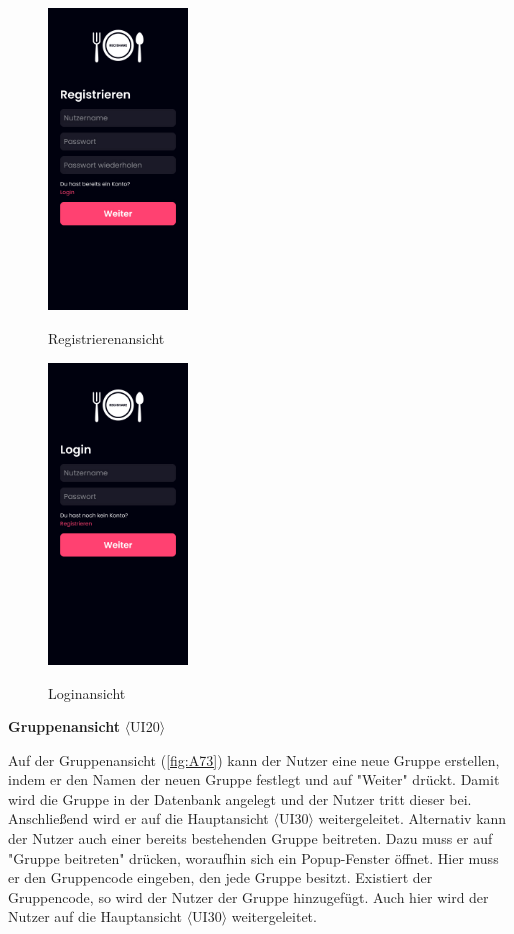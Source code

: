\documentclass[parskip=full]{scrartcl}
\begin{document}
\begin{figure}[htp]
    \begin{minipage}
        [t]{0.5\textwidth}
        \centering
        \includegraphics[height=80mm]{images/section7/RegisterView.jpg}
        \label{fig:A71}
        \caption{Registrierenansicht}
    \end{minipage}
    \begin{minipage}
        [t]{0.5\textwidth}
        \centering
        \includegraphics[height=80mm]{images/section7/LoginView.jpg}
        \label{fig:A72}
        \caption{Loginansicht}
    \end{minipage}
\end{figure}

\textbf{Gruppenansicht} $\langle$UI20$\rangle$

Auf der Gruppenansicht (\ref{fig:A73}) kann der Nutzer eine neue Gruppe erstellen, indem er den Namen der neuen Gruppe festlegt und auf "Weiter" drückt. Damit wird die Gruppe in der Datenbank angelegt und der Nutzer tritt dieser bei. Anschließend wird er auf die Hauptansicht $\langle$UI30$\rangle$ weitergeleitet. Alternativ kann der Nutzer auch einer bereits bestehenden Gruppe beitreten. Dazu muss er auf "Gruppe beitreten" drücken, woraufhin sich ein Popup-Fenster öffnet. Hier muss er den Gruppencode eingeben, den jede Gruppe besitzt. Existiert der Gruppencode, so wird der Nutzer der Gruppe hinzugefügt. Auch hier wird der Nutzer auf die Hauptansicht $\langle$UI30$\rangle$ weitergeleitet.
\end{document}

